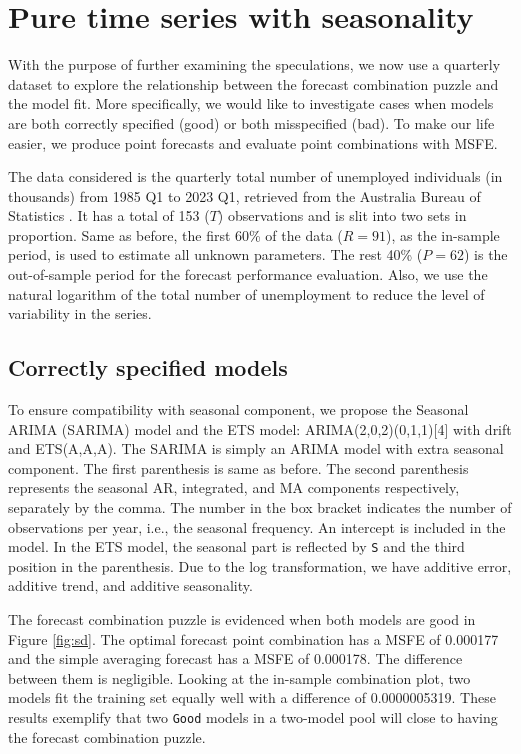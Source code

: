 \documentclass{monashthesis}
\begin{document}
\hypertarget{pure-time-series-with-seasonality}{%
\section{Pure time series with seasonality}\label{pure-time-series-with-seasonality}}

With the purpose of further examining the speculations, we now use a quarterly dataset to explore the relationship between the forecast combination puzzle and the model fit. More specifically, we would like to investigate cases when models are both correctly specified (good) or both misspecified (bad). To make our life easier, we produce point forecasts and evaluate point combinations with MSFE.

The data considered is the quarterly total number of unemployed individuals (in thousands) from 1985 Q1 to 2023 Q1, retrieved from the Australia Bureau of Statistics \autocite{ABS}. It has a total of 153 (\(T\)) observations and is slit into two sets in proportion. Same as before, the first 60\% of the data (\(R = 91\)), as the in-sample period, is used to estimate all unknown parameters. The rest 40\% (\(P = 62\)) is the out-of-sample period for the forecast performance evaluation. Also, we use the natural logarithm of the total number of unemployment to reduce the level of variability in the series.

\hypertarget{correctly-specified-models}{%
\subsection{Correctly specified models}\label{correctly-specified-models}}

To ensure compatibility with seasonal component, we propose the Seasonal ARIMA (SARIMA) model and the ETS model: ARIMA(2,0,2)(0,1,1){[}4{]} with drift and ETS(A,A,A). The SARIMA is simply an ARIMA model with extra seasonal component. The first parenthesis is same as before. The second parenthesis represents the seasonal AR, integrated, and MA components respectively, separately by the comma. The number in the box bracket indicates the number of observations per year, i.e., the seasonal frequency. An intercept is included in the model. In the ETS model, the seasonal part is reflected by \texttt{S} and the third position in the parenthesis. Due to the log transformation, we have additive error, additive trend, and additive seasonality.

The forecast combination puzzle is evidenced when both models are good in Figure \ref{fig:sd}. The optimal forecast point combination has a MSFE of 0.000177 and the simple averaging forecast has a MSFE of 0.000178. The difference between them is negligible. Looking at the in-sample combination plot, two models fit the training set equally well with a difference of 0.0000005319. These results exemplify that two \texttt{Good} models in a two-model pool will close to having the forecast combination puzzle.
\end{document}
